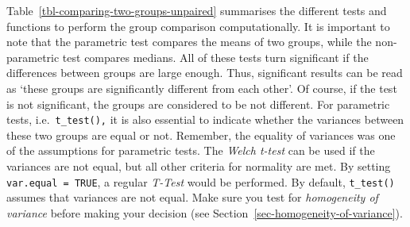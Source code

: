 \documentclass[
  letterpaper,
]{krantz}
\begin{document}
Table~\ref{tbl-comparing-two-groups-unpaired} summarises the different
tests and functions to perform the group comparison computationally. It
is important to note that the parametric test compares the means of two
groups, while the non-parametric test compares medians. All of these
tests turn significant if the differences between groups are large
enough. Thus, significant results can be read as `these groups are
significantly different from each other'. Of course, if the test is not
significant, the groups are considered to be not different. For
parametric tests, i.e.~\texttt{t\_test(),} it is also essential to
indicate whether the variances between these two groups are equal or
not. Remember, the equality of variances was one of the assumptions for
parametric tests. The \emph{Welch t-test} can be used if the variances
are not equal, but all other criteria for normality are met. By setting
\texttt{var.equal\ =\ TRUE}, a regular \emph{T-Test} would be performed.
By default, \texttt{t\_test()} assumes that variances are not equal.
Make sure you test for \emph{homogeneity of variance} before making your
decision (see Section~\ref{sec-homogeneity-of-variance}).
\end{document}
